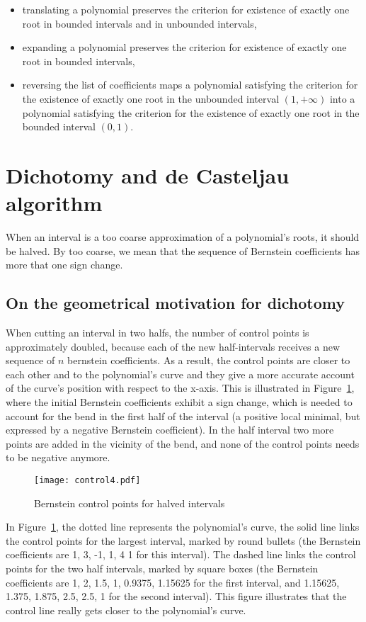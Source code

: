 \documentclass{article}
\begin{document}
\begin{itemize}
\item translating a polynomial preserves the criterion for existence
of exactly one root in bounded intervals and in unbounded intervals,
\item expanding a polynomial preserves the criterion for existence of
  exactly one root in bounded intervals,
\item reversing the list of coefficients maps a polynomial satisfying
  the criterion for the existence of exactly one root in the unbounded
  interval \((1,+\infty)\) into a polynomial satisfying the criterion
  for the existence of exactly one root in the bounded interval \((0,1)\).
\end{itemize}

\section{Dichotomy and de Casteljau algorithm}
\label{dichotomy}

When an interval is a too coarse approximation of a polynomial's
roots, it should be halved. By too coarse, we mean that the sequence
of Bernstein coefficients has more that one sign change.
\subsection{On the geometrical motivation for dichotomy}
When cutting an interval in two halfs, the number of control points is 
approximately doubled, because each of the new half-intervals receives a
new sequence of \(n\) bernstein coefficients.  As a result, the control points
are closer to each other and to the polynomial's curve and they give a more
accurate account of the curve's position with respect to the x-axis.  This is
illustrated in Figure~\ref{dichotomy-curve}, where the initial Bernstein
coefficients exhibit a sign change, which is needed to account for the bend
in the first half of the interval (a positive local minimal, but expressed
by a negative Bernstein coefficient).  In the half interval two more points
are added in the vicinity of the bend, and none of the control points needs
to be negative anymore.
\begin{figure}
\texttt{[image: control4.pdf]}
\caption{\label{dichotomy-curve}Bernstein control points for halved intervals}
\end{figure}

In Figure~\ref{dichotomy-curve}, the dotted line represents
the polynomial's curve, the solid line links the control points for
the largest interval, marked by round bullets (the Bernstein coefficients are
1, 3, -1, 1, 4 1 for this interval).  The dashed line links the control points
for the two half intervals, marked by square boxes
(the Bernstein coefficients are 1, 2, 1.5, 1,
0.9375, 1.15625 for the first interval, and 1.15625, 1.375, 1.875, 2.5, 2.5,
1 for the second interval).  This figure illustrates that the control line
really gets closer to the polynomial's curve.
\end{document}
